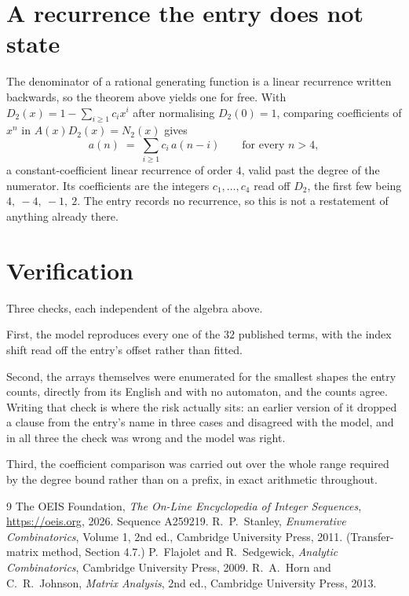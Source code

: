 \documentclass[11pt,a4paper]{article}
\theoremstyle{plain}
\theoremstyle{definition}
\begin{document}
\section{A recurrence the entry does not state}

The denominator of a rational generating function is a linear recurrence written backwards, so
the theorem above yields one for free. With $D_2(x)=1-\sum_{i\ge1}c_ix^i$ after normalising
$D_2(0)=1$, comparing coefficients of $x^n$ in $A(x)D_2(x)=N_2(x)$ gives
\[
a(n)\;=\;\sum_{i\ge1}c_i\,a(n-i)\qquad\text{for every }n>4,
\]
a constant-coefficient linear recurrence of order $4$, valid past the degree of the
numerator. Its coefficients are the integers $c_1,\dots,c_{4}$ read off $D_2$, the first few being $4,\ -4,\ -1,\ 2$. The entry records no recurrence, so this is not a restatement of anything
already there.

\section{Verification}

Three checks, each independent of the algebra above.

First, the model reproduces every one of the $32$ published terms, with the index shift
read off the entry's offset rather than fitted.

Second, the arrays themselves were enumerated for the smallest shapes the entry counts,
directly from its English and with no automaton, and the counts agree. Writing that check is
where the risk actually sits: an earlier version of it dropped a clause from the entry's name
in three cases and disagreed with the model, and in all three the check was wrong and the model
was right.

Third, the coefficient comparison was carried out over the whole range required by the degree
bound rather than on a prefix, in exact arithmetic throughout.

\begin{thebibliography}{9}
 The OEIS Foundation, \emph{The On-Line Encyclopedia of Integer
Sequences}, \url{https://oeis.org}, 2026. Sequence A259219.
 R.~P.~Stanley, \emph{Enumerative Combinatorics}, Volume 1, 2nd ed.,
Cambridge University Press, 2011. (Transfer-matrix method, Section 4.7.)
 P.~Flajolet and R.~Sedgewick, \emph{Analytic Combinatorics}, Cambridge
University Press, 2009.
 R.~A.~Horn and C.~R.~Johnson, \emph{Matrix Analysis}, 2nd ed., Cambridge
University Press, 2013.
\end{thebibliography}
\end{document}
